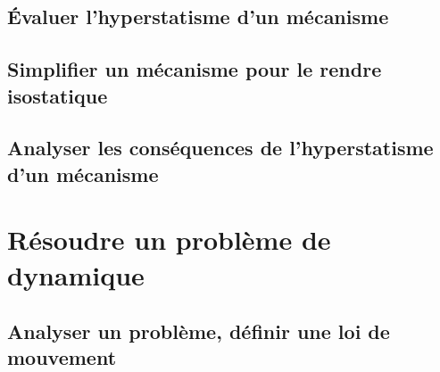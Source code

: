 \section{Évaluer l'hyperstatisme d'un mécanisme} 
\graphicspath{{\repStyle/png/}{../CHS/CHS-03-HS/64_EPAS/images/}} 
 
 
\graphicspath{{\repStyle/png/}{../CHS/CHS-03-HS/69_TrainA350/images/}} 
 
 
\graphicspath{{\repStyle/png/}{../CHS/CHS-03-HS/71_Robovolc/images/}} 
 
 
\graphicspath{{\repStyle/png/}{../CHS/CHS-03-HS/71_Robovolc_02/images/}} 
 
 
\graphicspath{{\repStyle/png/}{../CHS/CHS-03-HS/72_Tripteor/images/}} 
 
 
\graphicspath{{\repStyle/png/}{../CHS/CHS-03-HS/81_Piaggio/images/}} 
 
 
\graphicspath{{\repStyle/png/}{../CHS/CHS-03-HS/82_MAV/images/}} 
 
 
\graphicspath{{\repStyle/png/}{../CHS/CHS-03-HS/83_Roburoc/images/}} 
 
 
\graphicspath{{\repStyle/png/}{../CHS/CHS-03-HS/84_Nacelle/images/}} 
 
 
\clearpage 
\newpage 
\section{Simplifier un mécanisme pour le rendre isostatique} 
\clearpage 
\newpage 
\section{Analyser les conséquences de l'hyperstatisme d'un mécanisme} 
\clearpage 
\newpage 
\setchapterpreamble[u]{\margintoc} 
\chapter{Résoudre un problème de dynamique} 
\section{Analyser un problème, définir une loi de mouvement} 
\graphicspath{{\repStyle/png/}{../DYN/DYN-01/01_T/images/}} 
 
 
